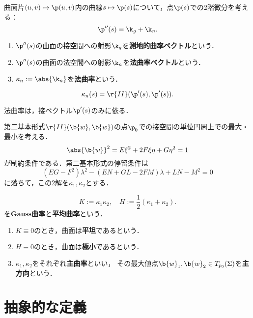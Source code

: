 \documentclass[uplatex,dvipdfmx]{jsreport}
\begin{document}
\begin{definition}
    曲面片$(u,v)\mapsto\p(u,v)$内の曲線$s\mapsto\p(s)$について，点$\p(s)$での2階微分を考える：
    \[\p''(s)=\k_g+\k_n.\]
    \begin{enumerate}
        \item $\p''(s)$の曲面の接空間への射影$\k_g$を\textbf{測地的曲率ベクトル}という．
        \item $\p''(s)$の曲面の法空間への射影$\k_n$を\textbf{法曲率ベクトル}という．
        \item $\kappa_n:=\abs{\k_n}$を\textbf{法曲率}という．
    \end{enumerate}
\end{definition}

\begin{proposition}[法曲率の第二基本形式による表現]
    \[\kappa_n(s)=\r{II}(\p'(s),\p'(s)).\]
\end{proposition}
\begin{remarks}
    法曲率は，接ベクトル$\p'(s)$のみに依る．
\end{remarks}

\begin{observation}
    第二基本形式$\r{II}(\b{w},\b{w})$の点$\p_0$での接空間の単位円周上での最大・最小を考える．
    \[\abs{\b{w}}^2=E\xi^2+2F\xi\eta+G\eta^2=1\]
    が制約条件である．第二基本形式の停留条件は
    \[(EG-F^2)\lambda^2-(EN+GL-2FM)\lambda+LN-M^2=0\]
    に落ちて，この2解を$\kappa_1,\kappa_2$とする．
\end{observation}

\begin{definition}
    \[K:=\kappa_1\kappa_2,\quad H:=\frac{1}{2}(\kappa_1+\kappa_2).\]
    を\textbf{Gauss曲率}と\textbf{平均曲率}という．
    \begin{enumerate}
        \item $K\equiv0$のとき，曲面は\textbf{平坦}であるという．
        \item $H\equiv0$のとき，曲面は\textbf{極小}であるという．
        \item $\kappa_1,\kappa_2$をそれぞれ\textbf{主曲率}といい，
        その最大値点$\b{w}_1,\b{w}_2\in T_{p_0}(\Sigma)$を\textbf{主方向}という．
    \end{enumerate}
\end{definition}

\section{抽象的な定義}
\end{document}
